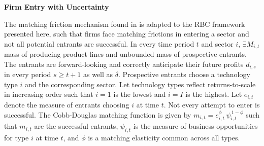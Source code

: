 \documentclass[a4paper,12pt]{article} %
\numberwithin{equation}{section} %
\numberwithin{figure}{section}
\numberwithin{table}{section}
\begin{document}
\medskip
\medskip
\noindent\textbf{Firm Entry with Uncertainty}
\medskip

The matching friction mechanism found in \textcite{sedlavcek2017growth} is adapted to the RBC framework presented here, such that firms face matching 
frictions in entering a sector and not all potential entrants are successful. In every time period $t$ and sector $i$, $\exists M_{i,t}$ mass of 
producing product lines and unbounded mass of prospective entrants. The entrants are forward-looking and correctly anticipate their future 
profits $d_{i,s}$ in every period $s\ge t+1$ as well as $\delta$. Prospective entrants choose a technology type $i$ and the corresponding sector.
Let technology types reflect returns-to-scale in increasing order such that $i = 1$ is the lowest and $i = I$ is the highest. 
Let $e_{i,t}$ denote the measure of entrants choosing $i$ at time $t$. Not every attempt to enter is successful. The Cobb-Douglas  matching function 
is given by $m_{i,t}= e_{i,t}^{\phi}\,\psi_{i,t}^{\,1-\phi}$ such that $m_{i,t}$ are the successful entrants, $\psi_{i,t}$ is the measure of 
business opportunities for type $i$ at time $t$, and $\phi$ is a matching elasticity common across all types. 
\end{document}

